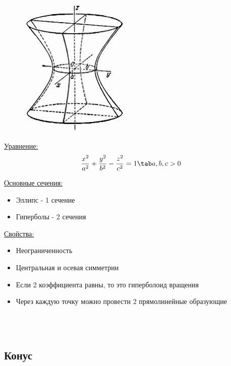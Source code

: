 \begin{figure}
    \includegraphics[width=0.7\linewidth]{images/однополостный гиперболоид.jpeg}
\end{figure}

\underline{Уравнение:}
\[
\dfrac{x^2}{a^2} + \dfrac{y^2}{b^2} - \dfrac{z^2}{c^2} = 1 \tab a, b, c > 0
\]

\underline{Основные сечения:}
\begin{itemize}
    \item Эллипс - 1 сечение
    \item Гиперболы - 2 сечения
\end{itemize}

\underline{Свойства:}
\begin{itemize}
    \item Неограниченность
    \item Центральная и осевая симметрии
    \item Если 2 коэффициента равны, то это гиперболоид вращения
    \item Через каждую точку можно провести 2 прямолинейные образующие
\end{itemize}

\tab\\ \tab\\
\subsection{Конус}

